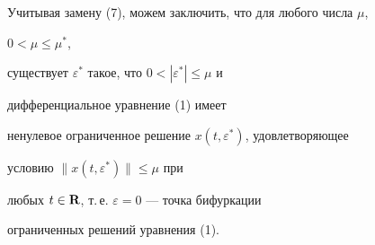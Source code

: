 \begin{pf}
 


Учитывая замену (7), можем заключить, что для любого числа $\mu$, 


$0<\mu\le\mu^*$, 


существует $\varepsilon^*$ такое, что $0<|\varepsilon^*|\le\mu$ и 


дифференциальное уравнение (1) имеет 


ненулевое ограниченное решение $x(t,\varepsilon^*)$, удовлетворяющее 


условию $\|x(t,\varepsilon^*)\|\le\mu$ при 


любых $t\in\bold R$, т.\,е. $\varepsilon=0$ --- точка бифуркации 


ограниченных решений уравнения (1). 


\end{pf} 


 


 


